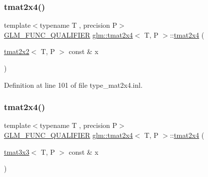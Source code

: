 \mbox{\label{structglm_1_1tmat2x4_afc1dac325dc83720bcd251de94f5fdfc}} 
\subsubsection{\texorpdfstring{tmat2x4()}{tmat2x4()}\hspace{0.1cm}{\footnotesize\ttfamily [11/22]}}
{\footnotesize\ttfamily template$<$typename T , precision P$>$ \\
\mbox{\hyperlink{setup_8hpp_a33fdea6f91c5f834105f7415e2a64407}{G\+L\+M\+\_\+\+F\+U\+N\+C\+\_\+\+Q\+U\+A\+L\+I\+F\+I\+ER}} \mbox{\hyperlink{structglm_1_1tmat2x4}{glm\+::tmat2x4}}$<$ T, P $>$\+::\mbox{\hyperlink{structglm_1_1tmat2x4}{tmat2x4}} (\begin{DoxyParamCaption}\item[{\mbox{\hyperlink{structglm_1_1tmat2x2}{tmat2x2}}$<$ T, P $>$ const \&}]{x }\end{DoxyParamCaption})}



Definition at line 101 of file type\+\_\+mat2x4.\+inl.

\mbox{\label{structglm_1_1tmat2x4_a315e700449248bbe7938b858a94e98ce}} 
\subsubsection{\texorpdfstring{tmat2x4()}{tmat2x4()}\hspace{0.1cm}{\footnotesize\ttfamily [12/22]}}
{\footnotesize\ttfamily template$<$typename T , precision P$>$ \\
\mbox{\hyperlink{setup_8hpp_a33fdea6f91c5f834105f7415e2a64407}{G\+L\+M\+\_\+\+F\+U\+N\+C\+\_\+\+Q\+U\+A\+L\+I\+F\+I\+ER}} \mbox{\hyperlink{structglm_1_1tmat2x4}{glm\+::tmat2x4}}$<$ T, P $>$\+::\mbox{\hyperlink{structglm_1_1tmat2x4}{tmat2x4}} (\begin{DoxyParamCaption}\item[{\mbox{\hyperlink{structglm_1_1tmat3x3}{tmat3x3}}$<$ T, P $>$ const \&}]{x }\end{DoxyParamCaption})}



